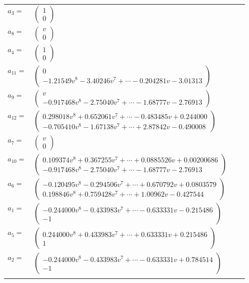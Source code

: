 \documentclass[1p]{elsarticle_modified}
\theoremstyle{definition}
\begin{document}
\begin{tabular}{m{7pt} m{180pt} m{7pt} m{180pt} }
\flushright $a_{3}=$&$\begin{pmatrix}1\\0\end{pmatrix}$ \\
\flushright $a_{8}=$&$\begin{pmatrix}v\\0\end{pmatrix}$ \\
\flushright $a_{4}=$&$\begin{pmatrix}1\\0\end{pmatrix}$ \\
\flushright $a_{11}=$&$\begin{pmatrix}0\\-1.21549 v^{8}-3.40246 v^{7}+\cdots-0.204281 v-3.01313\end{pmatrix}$ \\
\flushright $a_{9}=$&$\begin{pmatrix}v\\-0.917468 v^{8}-2.75040 v^{7}+\cdots-1.68777 v-2.76913\end{pmatrix}$ \\
\flushright $a_{12}=$&$\begin{pmatrix}0.298018 v^{8}+0.652061 v^{7}+\cdots-0.483485 v+0.244000\\-0.705410 v^{8}-1.67138 v^{7}+\cdots+2.87842 v-0.490008\end{pmatrix}$ \\
\flushright $a_{7}=$&$\begin{pmatrix}v\\0\end{pmatrix}$ \\
\flushright $a_{10}=$&$\begin{pmatrix}0.109374 v^{8}+0.367255 v^{7}+\cdots+0.0885526 v+0.00200686\\-0.917468 v^{8}-2.75040 v^{7}+\cdots-1.68777 v-2.76913\end{pmatrix}$ \\
\flushright $a_{6}=$&$\begin{pmatrix}-0.120495 v^{8}-0.294506 v^{7}+\cdots+0.670792 v+0.0803579\\0.198846 v^{8}+0.759428 v^{7}+\cdots+1.00962 v-0.427544\end{pmatrix}$ \\
\flushright $a_{1}=$&$\begin{pmatrix}-0.244000 v^{8}-0.433983 v^{7}+\cdots-0.633331 v-0.215486\\-1\end{pmatrix}$ \\
\flushright $a_{5}=$&$\begin{pmatrix}0.244000 v^{8}+0.433983 v^{7}+\cdots+0.633331 v+0.215486\\1\end{pmatrix}$ \\
\flushright $a_{2}=$&$\begin{pmatrix}-0.244000 v^{8}-0.433983 v^{7}+\cdots-0.633331 v+0.784514\\-1\end{pmatrix}$\\&\end{tabular}
\end{document}
